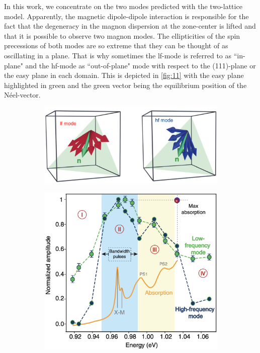 In this work, we concentrate on the two modes predicted with the two-lattice model.
Apparently, the magnetic dipole-dipole interaction is responsible for the fact that the degeneracy in the magnon dispersion at the zone-center is lifted and that it is possible to observe two magnon modes. 
The ellipticities of the spin precessions of both modes are so extreme that they can be thought of as oscillating in a plane.
That is why sometimes the lf-mode is referred to as ``in-plane" and the hf-mode as ``out-of-plane" mode with respect to the (111)-plane or the easy plane in each domain. This is depicted in \autoref{fig:11} with the easy plane highlighted in green and the green vector being the equilibrium position of the Néel-vector.
\begin{figure}[htb!]
    \centering
    \begin{subfigure}[c]{0.45\textwidth}
        \includegraphics[width=\textwidth]{pictures/11.png}
        \caption{}
        \label{fig:11}
    \end{subfigure}
    \hspace{0.4cm}
    \begin{subfigure}[c]{0.5\textwidth}
        \includegraphics[width=\textwidth]{pictures/7.png}

\end{subfigure}
\end{figure}
